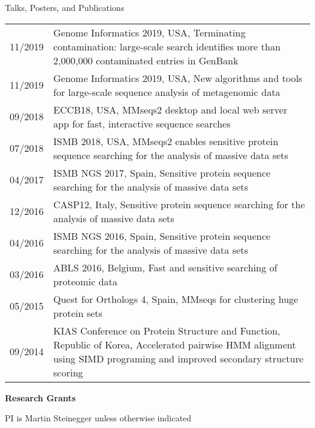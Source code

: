 \documentclass{resume} %
\begin{document}
\begin{rSection}{Talks, Posters, and Publications}
\begin{tabular}{p{2.5cm}p{14.1cm}}
11/2019 & Genome Informatics 2019, USA, Terminating contamination: large-scale search identifies more than 2,000,000 contaminated entries in GenBank 
\\[1.mm] 
11/2019 & Genome Informatics 2019, USA, New algorithms and tools for large-scale sequence analysis of metagenomic data
\\[1.mm] 
09/2018 & ECCB18, USA, MMseqs2 desktop and local web server app for fast, interactive sequence searches
\\[1.mm] 
07/2018 & ISMB 2018, USA, MMseqs2 enables sensitive protein sequence searching for the analysis of massive data sets
\\[1.mm] 
04/2017 & ISMB NGS 2017, Spain, Sensitive protein sequence searching for the analysis of massive data sets
\\[1.mm] 
12/2016 & CASP12, Italy, Sensitive protein sequence searching for the analysis of massive data sets
\\[1.mm] 
04/2016 & ISMB NGS 2016, Spain, Sensitive protein sequence searching for the analysis of massive data sets
\\[1.mm] 
03/2016 & ABLS 2016, Belgium, Fast and sensitive searching of proteomic data
\\[1.mm] 
05/2015 & Quest for Orthologs 4, Spain, MMseqs for clustering huge protein sets
\\[1.mm] 
09/2014 & KIAS Conference on Protein Structure and Function, Republic of Korea, Accelerated pairwise HMM alignment using SIMD programing and improved secondary structure scoring 
\\[1mm]
\end{tabular}
\vspace{1mm}

\newpage
{\bf Research Grants }\vspace{1mm}

PI is Martin Steinegger unless otherwise indicated


\end{rSection}
\end{document}
